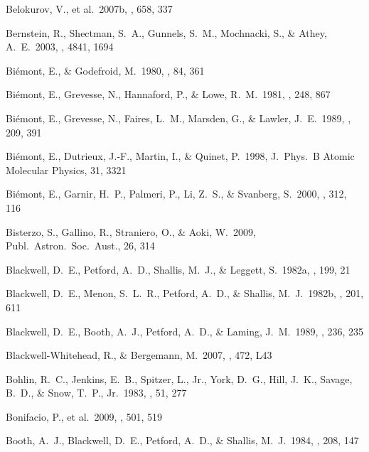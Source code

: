 \documentclass{emulateapj}
\begin{document}
\begin{thebibliography}{}
 Belokurov, V., et 
al.\ 2007b, \apj, 658, 337   %

 Bernstein, R., 
Shectman, S.~A., Gunnels, S.~M., Mochnacki, S., 
\& Athey, A.~E.\ 2003, \procspie, 4841, 1694 

 Bi{\'e}mont, E., \& 
Godefroid, M.\ 1980, \aap, 84, 361 

 Bi{\'e}mont, E., Grevesse, 
N., Hannaford, P., \& Lowe, R.~M.\ 1981, \apj, 248, 867 

 Bi{\'e}mont, E., Grevesse, N., 
Faires, L.~M., Marsden, G., \& Lawler, J.~E.\ 1989, \aap, 209, 391 

 Bi{\'e}mont, E., 
Dutrieux, J.-F., Martin, I., \& Quinet, P.\ 1998, J.\ Phys.\ B 
Atomic Molecular Physics, 31, 3321 

 Bi{\'e}mont, E., 
Garnir, H.~P., Palmeri, P., Li, Z.~S., 
\& Svanberg, S.\ 2000, \mnras, 312, 116 

 Bisterzo, S., Gallino, 
R., Straniero, O., \& Aoki, W.\ 2009, Publ.\ Astron.\ Soc.\ Aust., 26, 314 

 Blackwell, D.~E., 
Petford, A.~D., Shallis, M.~J., \& Leggett, S.\ 1982a, \mnras, 199, 21 

 Blackwell, D.~E., 
Menon, S.~L.~R., Petford, A.~D., \& Shallis, M.~J.\ 1982b, \mnras, 201, 611 

 Blackwell, D.~E., 
Booth, A.~J., Petford, A.~D., \& Laming, J.~M.\ 1989, \mnras, 236, 235 

Blackwell-Whitehead, R., \& Bergemann, M.\ 2007, \aap, 472, L43 

 Bohlin, R.~C., Jenkins, 
E.~B., Spitzer, L., Jr., York, D.~G., Hill, J.~K., Savage, B.~D., 
\& Snow, T.~P., Jr.\ 1983, \apjs, 51, 277 

 Bonifacio, P., et 
al.\ 2009, \aap, 501, 519

 Booth, A.~J., Blackwell, 
D.~E., Petford, A.~D., \& Shallis, M.~J.\ 1984, \mnras, 208, 147 


\end{thebibliography}
\end{document}

